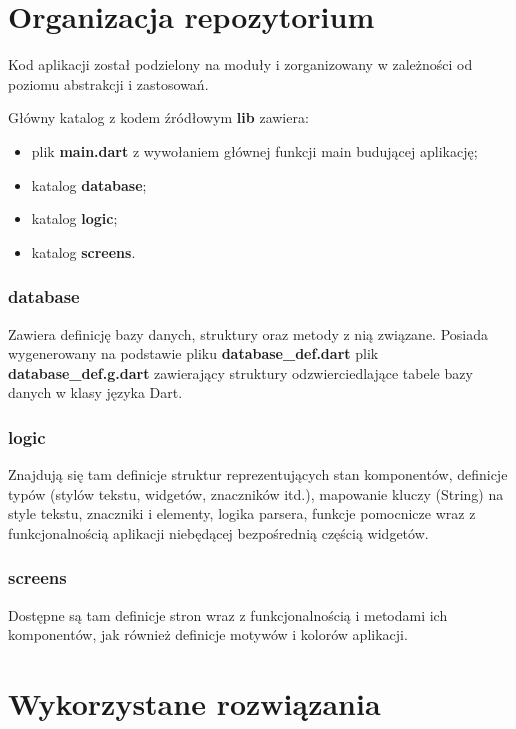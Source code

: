 \section{Organizacja repozytorium}

Kod aplikacji został podzielony na moduły i zorganizowany w zależności od poziomu abstrakcji i zastosowań.

Główny katalog z kodem źródłowym \textbf{lib} zawiera:

\begin{itemize}
    \item plik \textbf{main.dart} z wywołaniem głównej funkcji main budującej aplikację;
    \item katalog \textbf{database};
    \item katalog \textbf{logic};
    \item katalog \textbf{screens}.
\end{itemize}

\subsubsection{database}

Zawiera definicję bazy danych, struktury oraz metody z nią związane. Posiada wygenerowany na podstawie pliku \textbf{database\_{}def.dart} plik \textbf{database\_{}def.g.dart} zawierający struktury odzwierciedlające tabele bazy danych w klasy języka Dart. 

\subsubsection{logic}

Znajdują się tam definicje struktur reprezentujących stan komponentów, definicje typów (stylów tekstu, widgetów, znaczników itd.), mapowanie kluczy (String) na style tekstu, znaczniki i elementy, logika parsera, funkcje pomocnicze wraz z funkcjonalnością aplikacji niebędącej bezpośrednią częścią widgetów.

\subsubsection{screens}

Dostępne są tam definicje stron wraz z funkcjonalnością i metodami ich komponentów, jak również definicje motywów i kolorów aplikacji.

\section{Wykorzystane rozwiązania}

